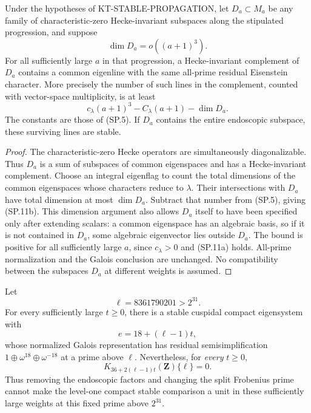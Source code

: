 \begin{corollary}
Under the hypotheses of KT-STABLE-PROPAGATION, let
$D_a\subset M_a$ be any family of characteristic-zero
Hecke-invariant subspaces along the stipulated progression,
and suppose
\[
                         \dim D_a=o((a+1)^3).
                                                               \tag{SP.11a}
\]
For all sufficiently large $a$ in that progression, a
Hecke-invariant complement of $D_a$ contains a common
eigenline with the same all-prime residual Eisenstein
character. More precisely the number of such lines in
the complement, counted with vector-space multiplicity,
is at least
\[
             c_\lambda(a+1)^3-C_\lambda(a+1)-\dim D_a.
                                                               \tag{SP.11b}
\]
The constants are those of (SP.5). If $D_a$ contains the
entire endoscopic subspace, these surviving lines are stable.
\end{corollary}

\begin{proof}
The characteristic-zero Hecke operators are simultaneously
diagonalizable. Thus $D_a$ is a sum of subspaces of common
eigenspaces and has a Hecke-invariant complement. Choose
an integral eigenflag to count the total dimensions of
the common eigenspaces whose characters reduce to
$\lambda$. Their intersections with $D_a$ have total
dimension at most $\dim D_a$. Subtract that number from
(SP.5), giving (SP.11b). This dimension argument also
allows $D_a$ itself to have been specified only after
extending scalars: a common eigenspace has an algebraic
basis, so if it is not contained in $D_a$, some algebraic
eigenvector lies outside $D_a$. The bound is positive for
all sufficiently large $a$, since $c_\lambda>0$ and
(SP.11a) holds. All-prime normalization and the Galois
conclusion are unchanged. No compatibility between the
subspaces $D_a$ at different weights is assumed.
\end{proof}

\begin{corollary}
Let
\[
                      \ell=8361790201>2^{31}.
                                                               \tag{SP.12}
\]
For every sufficiently large $t\geq0$, there is a stable
cuspidal compact eigensystem with
\[
              e=18+(\ell-1)t,
\]
whose normalized Galois representation has residual
semisimplification $1\oplus\omega^{18}\oplus\omega^{-18}$
at a prime above $\ell$. Nevertheless, for \emph{every}
$t\geq0$,
\[
                K_{36+2(\ell-1)t}(\mathbf Z)\{\ell\}=0.
                                                               \tag{SP.13}
\]
Thus removing the endoscopic factors and changing the
split Frobenius prime cannot make the level-one compact
stable comparison a unit in these sufficiently large
weights at this fixed prime above $2^{31}$.
\end{corollary}

